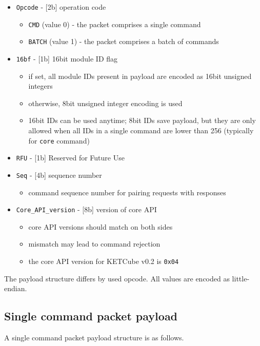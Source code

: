 \begin{itemize}
	\item \texttt{Opcode} - [2b] operation code
		\begin{itemize}
			\item \texttt{CMD} (value 0) - the packet comprises a single command
			\item \texttt{BATCH} (value 1) - the packet comprises a batch of commands
		\end{itemize}
	\item \texttt{16bf} - [1b] 16bit module ID flag
		\begin{itemize}
			\item if set, all module IDs present in payload are encoded as 16bit unsigned integers
			\item otherwise, 8bit unsigned integer encoding is used
			\item 16bit IDs can be used anytime; 8bit IDs save payload, but they are only allowed when all IDs in a single command are lower than 256 (typically for \texttt{core} command)
		\end{itemize}
	\item \texttt{RFU} - [1b] Reserved for Future Use
	\item \texttt{Seq} - [4b] sequence number
		\begin{itemize}
			\item command sequence number for pairing requests with responses
		\end{itemize}
	\item \texttt{Core\_API\_version} - [8b] version of core API
		\begin{itemize}
			\item core API versions should match on both sides
			\item mismatch may lead to command rejection
			\item the core API version for KETCube v0.2 is \texttt{0x04}
		\end{itemize}
\end{itemize}

The payload structure differs by used opcode. All values are encoded as little-endian.

\clearpage
\subsection{Single command packet payload}

A single command packet payload structure is as follows.

